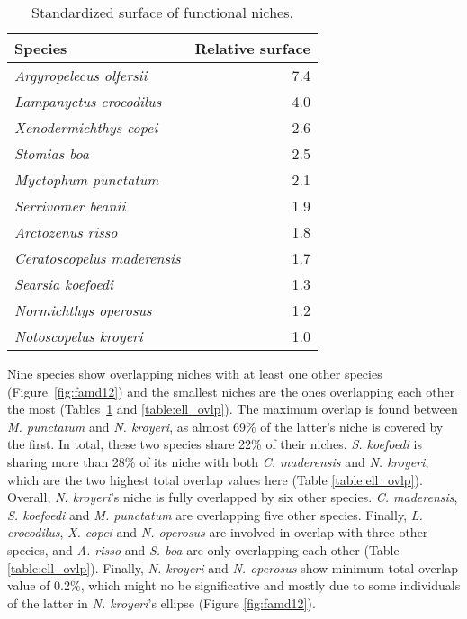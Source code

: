 \begin{table}[!htbp]
\centering
\caption[Standardized surface of functional niches]{Standardized surface of functional niches.}
\label{table:sp_surface}
\begin{tabular}{lr}
  \toprule
Species & Relative surface \\ 
  \midrule
  \emph{Argyropelecus olfersii} & 7.4 \\ 
  \emph{Lampanyctus crocodilus} & 4.0 \\ 
  \emph{Xenodermichthys copei} & 2.6 \\ 
  \emph{Stomias boa} & 2.5 \\ 
  \emph{Myctophum punctatum} & 2.1 \\ 
  \emph{Serrivomer beanii} & 1.9 \\ 
  \emph{Arctozenus risso} & 1.8 \\ 
  \emph{Ceratoscopelus maderensis} & 1.7 \\ 
  \emph{Searsia koefoedi} & 1.3 \\ 
  \emph{Normichthys operosus} & 1.2 \\ 
  \emph{Notoscopelus kroyeri} & 1.0 \\ 
   \bottomrule
\end{tabular}
\end{table}

Nine species show overlapping niches with at least one other species (Figure~\ref{fig:famd12}) and the smallest niches are the ones overlapping each other the most (Tables~\ref{table:sp_surface} and \ref{table:ell_ovlp}). The maximum  overlap is found between \textit{M. punctatum} and \textit{N. kroyeri}, as almost 69\% of the latter's niche is covered by the first. In total, these two species share 22\% of their niches. \textit{S. koefoedi} is sharing more than 28\% of its niche with both \textit{C. maderensis} and \textit{N. kroyeri}, which are the two highest total overlap values here (Table \ref{table:ell_ovlp}). Overall, \textit{N. kroyeri}'s niche is fully overlapped by six other species. \textit{C. maderensis}, \textit{S. koefoedi} and \textit{M. punctatum} are overlapping five other species. Finally, \textit{L. crocodilus}, \textit{X. copei} and \textit{N. operosus} are involved in overlap with three other species, and \textit{A. risso} and \textit{S. boa} are only overlapping each other (Table \ref{table:ell_ovlp}). Finally, \textit{N. kroyeri} and \textit{N. operosus} show minimum total overlap value of 0.2\%, which might no be significative and mostly due to some individuals of the latter in \textit{N. kroyeri}'s ellipse (Figure \ref{fig:famd12}). 

